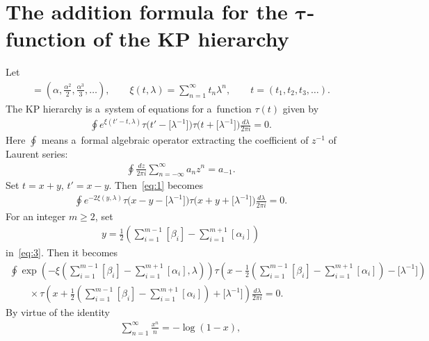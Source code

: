 \section[The addition formula for the $\tau$-function of the KP hierarchy]{The addition formula for the $\boldsymbol{\tau}$-function of the KP hierarchy} \label{section2}

Let
\begin{gather*}
[\alpha]=\left(\alpha,\frac{\alpha^2}{2},\frac{\alpha^3}{3},\dots\right),
\qquad
\xi(t,\lambda)=\sum_{n=1}^{\infty}t_n\lambda^n,
\qquad
t=(t_1,t_2,t_3,\dots).
\end{gather*}
The KP hierarchy is a~system of equations for a~function $\tau(t)$ \cite{DJKM1,JM1, MJD1} given by
\begin{gather}
\oint e^{\xi(t'-t,\lambda)}\tau\big(t'-\big[\lambda^{-1}\big]\big)\tau\big(t+\big[\lambda^{-1}\big]\big)\frac{d\lambda}{2\pi i}=0.
\label{eq:1}
\end{gather}
Here $\oint$ means a~formal algebraic operator extracting the coef\/f\/icient of $z^{-1}$ of Laurent series:
\begin{gather*}%
\oint\frac{dz}{2\pi i}\sum_{n=-\infty}^{\infty}a_n z^n=a_{-1}.
\end{gather*}
Set $t=x+y$, $t'=x-y$.
Then~\eqref{eq:1} becomes
\begin{gather}
\oint e^{-2\xi(y,\lambda)}\tau\big(x-y-\big[\lambda^{-1}\big]\big)\tau\big(x+y+\big[\lambda^{-1}\big]\big)\frac{d\lambda}{2\pi i}=0.
\label{eq:3}
\end{gather}
For an integer $m\ge2$, set
\begin{gather}
y=\frac{1}{2}\left(\sum_{i=1}^{m-1}[\beta_i]-\sum_{i=1}^{m+1}[\alpha_i]\right)
\label{eq:22}
\end{gather}
in~\eqref{eq:3}. Then it becomes
\begin{gather}
\oint\exp\left({-\xi\left(\displaystyle\sum_{i=1}^{m-1}[\beta_i]-\sum_{i=1}^{m+1}[\alpha_i],\lambda\right)}\right)
\tau\left(x-\frac{1}{2}\left(\sum_{i=1}^{m-1}[\beta_i]-\sum_{i=1}^{m+1}[\alpha_i]\right)-\big[\lambda^{-1}
\big]\right)\nonumber
\\
\qquad
{}\times\tau\left(x+\frac{1}{2}\left(\sum_{i=1}^{m-1}[\beta_i]-\sum_{i=1}^{m+1}[\alpha_i]\right)+\big[\lambda^{-1}
\big]\right)\frac{d\lambda}{2\pi i}=0.
\label{eq:4}
\end{gather}
By virtue of the identity
\begin{gather*}
\sum_{n=1}^{\infty}\frac{x^n}{n}=-\log(1-x),
\end{gather*}
